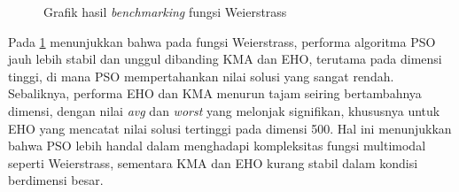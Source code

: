 \begin{figure}[H]
\caption{Grafik hasil \textit{benchmarking} fungsi Weierstrass}
\label{fig:graph_weierstrass}
\end{figure}

Pada \cref{fig:graph_weierstrass} menunjukkan bahwa pada fungsi Weierstrass, performa algoritma PSO jauh lebih stabil dan unggul dibanding KMA dan EHO, terutama pada dimensi tinggi, di mana PSO mempertahankan nilai solusi yang sangat rendah. Sebaliknya, performa EHO dan KMA menurun tajam seiring bertambahnya dimensi, dengan nilai \textit{avg} dan \textit{worst} yang melonjak signifikan, khususnya untuk EHO yang mencatat nilai solusi tertinggi pada dimensi 500. Hal ini menunjukkan bahwa PSO lebih handal dalam menghadapi kompleksitas fungsi multimodal seperti Weierstrass, sementara KMA dan EHO kurang stabil dalam kondisi berdimensi besar.

